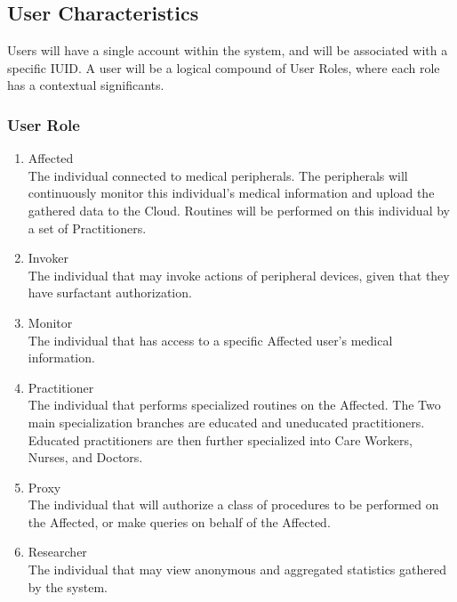 \subsection{User Characteristics}
	Users will have a single account within the system, and will be associated with a specific IUID. A user will be a logical compound of User Roles, where each role has a contextual significants.
\subsubsection{User Role}
\begin{enumerate}
	\item{Affected}\\ The individual connected to medical peripherals. The peripherals will continuously monitor this individual's medical information and upload the gathered data to the Cloud. Routines will be performed on this individual by a set of Practitioners.
	\item{Invoker}\\ The individual that may invoke actions of peripheral devices, given that they have surfactant authorization.
	\item{Monitor}\\ The individual that has access to a specific Affected user's medical information.
	\item{Practitioner}\\ The individual that performs specialized routines on the Affected. The Two main specialization branches are educated and uneducated practitioners. Educated practitioners are then further specialized into Care Workers, Nurses, and Doctors.
	\item{Proxy}\\ The individual that will authorize a class of procedures to be performed on the Affected, or make queries on behalf of the Affected.
	\item{Researcher}\\ The individual that may view anonymous and aggregated statistics gathered by the system.
\end{enumerate}